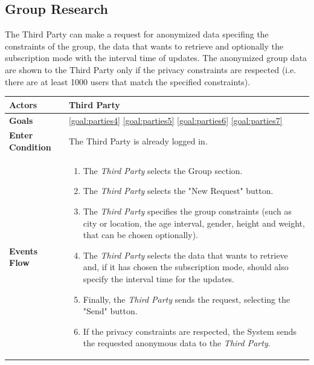 \newpage
\subsection{Group Research}
The Third Party can make a request for anonymized data specifing the constraints of the group, the data that wants to retrieve and optionally the subscription mode with the interval time of updates. The anonymized group data are shown to the Third Party only if the privacy constraints are respected (i.e. there are at least 1000 users that match the specified constraints).

\begin{table}[H]
	\centering
    
    \begin{tabular}{|p{3.5cm}|p{10.3cm}|}
    
    \hline
    \textbf{\large{Actors}} & Third Party \\ 			
    \hline
    \textbf{\large{Goals}} 				& \ref{goal:parties4}                                                         \ref{goal:parties5}                                    \ref{goal:parties6} \ref{goal:parties7}\\
    
    \hline
    
    \textbf{\large{Enter Condition}}	& The Third Party is already logged in. \\
    
    \hline
    
    \textbf{\large{Events Flow}}		& \begin{enumerate}[leftmargin=0.5cm]
                                \item The \emph{Third Party} selects the Group section.
                                \item The \emph{Third Party} selects the "New Request" button.
                                \item The \emph{Third Party} specifies the group constraints (such as city or location, the age interval, gender, height and weight, that can be chosen optionally).
                                 \item The \emph{Third Party} selects the data that wants to retrieve and, if it has chosen the subscription mode, should also specify the interval time for the updates.
                                 \item Finally, the \emph{Third Party} sends the request, selecting the "Send" button.
                                 \item If the privacy constraints are respected, the System sends the requested anonymous data to the \emph{Third Party}.
                                           

\end{enumerate}
\end{tabular}
\end{table}
